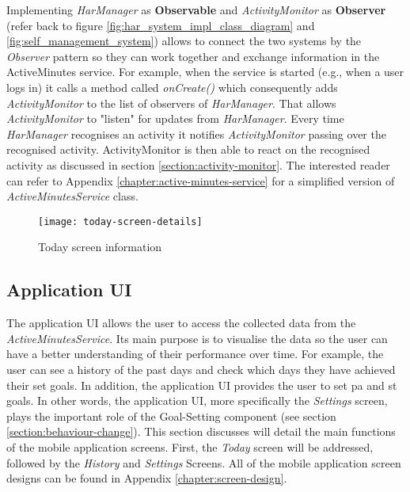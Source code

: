     Implementing \textit{HarManager} as \textbf{Observable} and \textit{ActivityMonitor} as \textbf{Observer}  (refer back to figure \ref{fig:har_system_impl_class_diagram} and \ref{fig:self_management_system}) allows to connect the two systems by the \textit{Observer} pattern so they can work together and exchange information in the ActiveMinutes service. For example, when the service is started (e.g., when a user logs in) it calls a method called \textit{onCreate()} which consequently adds \textit{ActivityMonitor} to the list of observers of \textit{HarManager}. That allows \textit{ActivityMonitor} to "listen" for updates from \textit{HarManager}. Every time \textit{HarManager} recognises an activity it notifies \textit{ActivityMonitor} passing over the recognised activity. ActivityMonitor is then able to react on the recognised activity as discussed in section \ref{section:activity-monitor}. The interested reader can refer to Appendix \ref{chapter:active-minutes-service} for a simplified version of \textit{ActiveMinutesService} class.
    
    \begin{wrapfigure}[18]{R}{0.29\textwidth}
    \begin{center}
    \texttt{[image: today-screen-details]}
    \end{center}
    \caption{Today screen information}
    \label{fig:today-screen-info}
    \end{wrapfigure}
    
    
    \subsection{Application UI}
    The application UI allows the user to access the collected data from the \textit{ActiveMinutesService}. Its main purpose is to visualise the data so the user can have a better understanding of their performance over time. For example, the user can see a history of the past days and check which days they have achieved their set goals. In addition, the application UI provides the user to set \gls{pa} and \gls{st} goals. In other words, the application UI, more specifically the \textit{Settings} screen, plays the important role of the Goal-Setting component (see section \ref{section:behaviour-change}). This section discusses will detail the main functions of the mobile application screens. First, the \textit{Today} screen will be addressed, followed by the \textit{History} and \textit{Settings} Screens. All of the mobile application screen designs can be found in Appendix \ref{chapter:screen-design}.
    
